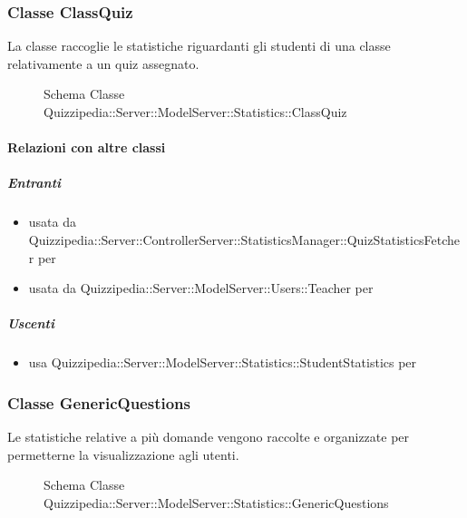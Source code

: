 \subsubsection{Classe ClassQuiz}
La classe raccoglie le statistiche riguardanti gli studenti di una classe relativamente a un quiz assegnato.
\begin{figure}[H]
\centering
\noindent{}
\caption[Schema Classe ClassQuiz]{Schema Classe Quizzipedia::Server::ModelServer::Statistics::ClassQuiz}
\end{figure}
\paragraph{Relazioni con altre classi}
\subparagraph{Entranti}
\begin{itemize}
\item usata da Quizzipedia::Server::ControllerServer::StatisticsManager::QuizStatisticsFetcher per 
\item usata da Quizzipedia::Server::ModelServer::Users::Teacher per 
\end{itemize}
\subparagraph{Uscenti}
\begin{itemize}
\item usa Quizzipedia::Server::ModelServer::Statistics::StudentStatistics per 
\end{itemize}
\subsubsection{Classe GenericQuestions}
Le statistiche relative a più domande vengono raccolte e organizzate per permetterne la visualizzazione agli utenti.
\begin{figure}[H]
\centering
\noindent{}
\caption[Schema Classe GenericQuestions]{Schema Classe Quizzipedia::Server::ModelServer::Statistics::GenericQuestions}
\end{figure}

